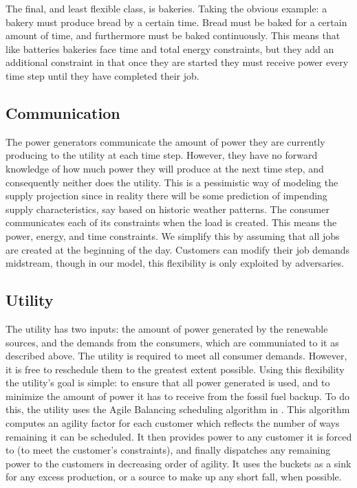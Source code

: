 \documentclass[conference]{IEEEtran}
\begin{document}
The final, and least flexible class, is bakeries. Taking the obvious example: a bakery must produce bread by a certain time. Bread must be baked for a certain amount of time, and furthermore must be baked continuously. This means that like batteries bakeries face time and total energy constraints, but they add an additional constraint in that once they are started they must receive power every time step until they have completed their job.

\subsection{Communication}
\label{Communication}

The power generators communicate the amount of power they are currently producing to the utility at each time step. However, they have no forward knowledge of how much power they will produce at the next time step, and consequently neither does the utility. This is a pessimistic way of modeling the supply projection since in reality there will be some prediction of impending supply characteristics, say based on historic weather patterns. The consumer communicates each of its constraints when the load is created. This means the power, energy, and time constraints. We simplify this by assuming that all jobs are created at the beginning of the day. Customers can modify their job demands midstream, though in our model, this flexibility is only exploited by adversaries.

\subsection{Utility}
\label{Utility}

The utility has two inputs: the amount of power generated by the renewable sources, and the demands from the consumers, which are communiated to it as described above. The utility is required to meet all consumer demands. However, it is free to reschedule them to the greatest extent possible. Using this flexibility the utility's goal is simple: to ensure that all power generated is used, and to minimize the amount of power it has to receive from the fossil fuel backup. To do this, the utility uses the Agile Balancing scheduling algorithm in \cite{petersen2013taxonomy}. This algorithm computes an agility factor for each customer which reflects the number of ways remaining it can be scheduled.  It then provides power to any customer it is forced to (to meet the customer's constraints), and finally dispatches any remaining power to the customers in decreasing order of agility.  It uses the buckets as a sink for any excess production, or a source to make up any short fall, when possible.
\end{document}
